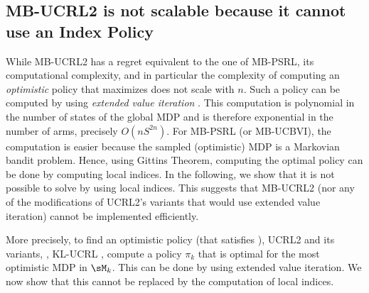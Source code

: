 \subsection{MB-UCRL2 is not scalable because it cannot use an Index Policy}
\label{ssec:no-OFU}

While MB-UCRL2 has a regret equivalent to the one of MB-PSRL, its computational complexity, and in particular the complexity of computing an \emph{optimistic} policy that maximizes  does not scale with $n$. Such a policy can be computed by using \emph{extended value iteration} \cite{jaksch2010near}. This computation is polynomial in the number of states of the global MDP and is therefore exponential in the number of arms, precisely $O(nS^{2n})$.
For MB-PSRL (or MB-UCBVI), the computation is easier because the sampled (optimistic) MDP is a Markovian bandit problem. Hence, using Gittins Theorem, computing the optimal policy can be done by computing local indices. In the following, we show that it is not possible to solve  by using local indices. This suggests that MB-UCRL2 (nor any of the modifications of UCRL2's variants that would use extended value iteration) cannot be implemented efficiently.

More precisely, to find an optimistic policy (that satisfies ), UCRL2 and its variants, \eg, KL-UCRL \cite{filippi2010optimism}, compute a policy $\pi_k$ that is optimal for the most optimistic MDP in $\sM_k$. This can be done by using extended value iteration. We now show that this cannot be replaced by the computation of local indices.

